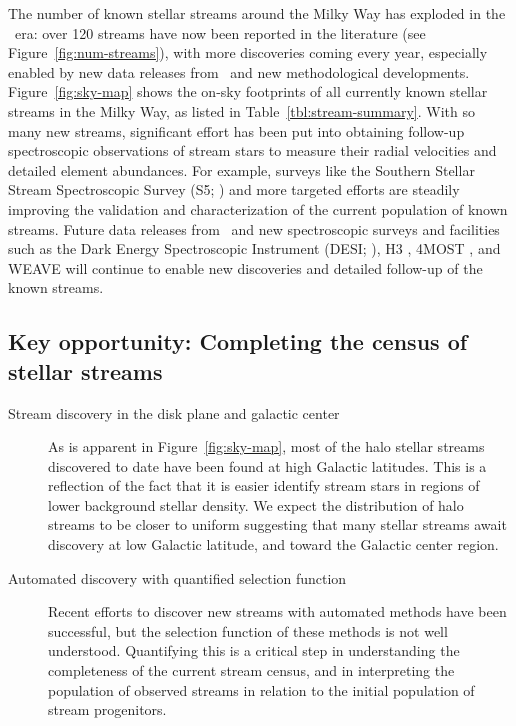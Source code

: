 \documentclass[final,5p,times,twocolumn,authoryear]{elsarticle}
\begin{document}
The number of known stellar streams around the Milky Way has exploded in the \gaia\ era:
over 120 streams have now been reported in the literature (see
Figure~\ref{fig:num-streams}), with more discoveries coming every year, especially
enabled by new data releases from \gaia\ and new methodological developments.
Figure~\ref{fig:sky-map} shows the on-sky footprints of all currently known stellar
streams in the Milky Way, as listed in Table~\ref{tbl:stream-summary}.
With so many new streams, significant effort has been put into obtaining follow-up
spectroscopic observations of stream stars to measure their radial velocities and
detailed element abundances.
For example, surveys like the Southern Stellar Stream Spectroscopic Survey (S5;
\citep{li:2019,li:2022}) and more targeted efforts \citep[e.g.,][]{ibata:2021} are
steadily improving the validation and characterization of the current population of
known streams.
Future data releases from \gaia\ and new spectroscopic surveys and facilities such as
the Dark Energy Spectroscopic Instrument (DESI; \citealt{desi:2016}), H3
\citep{conroy:2019}, 4MOST \citep{4most:2012}, and WEAVE \citep{weave:2012} will
continue to enable new discoveries and detailed follow-up of the known streams.


\subsection{Key opportunity: Completing the census of stellar streams}
\begin{description}
    \item[Stream discovery in the disk plane and galactic center] As is apparent in
    Figure~\ref{fig:sky-map}, most of the halo stellar streams discovered to date have
    been found at high Galactic latitudes. This is a reflection of the fact that it is
    easier identify stream stars in regions of lower background stellar density. We
    expect the distribution of halo streams to be closer to uniform suggesting that many
    stellar streams await discovery at low Galactic latitude, and toward the Galactic
    center region.
    \item[Automated discovery with quantified selection function] Recent efforts to
    discover new streams with automated methods have been successful, but the selection
    function of these methods is not well understood. Quantifying this is a critical
    step in understanding the completeness of the current stream census, and in
    interpreting the population of observed streams in relation to the initial
    population of stream progenitors.
\end{description}
\end{document}
